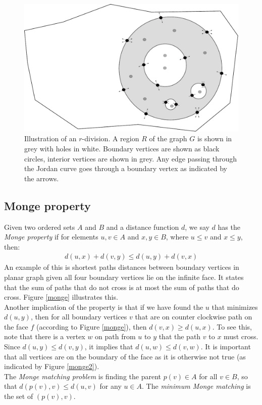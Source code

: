 \begin{figure}[h!]
  \includegraphics[width=1.0\textwidth]{figs/rdiv.pdf}
  \caption{Illustration of an $r$-division. A region $R$ of the graph $G$ is shown in
  grey with holes in white. Boundary vertices are shown as black circles, interior vertices are shown in
grey. Any edge passing through the Jordan curve goes through a boundary vertex as
indicated by the arrows.}
    \label{rdiv}
\end{figure}

\subsection{Monge property}
Given two ordered sets $A$ and $B$ and a distance function $d$, we say $d$ has the
\textit{Monge property} if for elements $u, v\in A$ and $x, y\in B$, where
$u\leq v$ and $x\leq y$, then:
\begin{align*}
  d(u,x)+d(v,y)\leq d(u, y)+d(v,x)
\end{align*}
An example of this is shortest paths distances between boundary vertices in planar graph
given all four boundary vertices lie on the infinite face. It states that the sum of
paths that do not cross is at most the sum of paths that do cross. Figure \ref{monge}
illustrates this. \\
Another implication of the property is that if we have found the $u$ that minimizes $d(u,y)$,
then for all boundary vertices $v$ that are on  counter clockwise path on the face $f$
(according to Figure \ref{monge}), then $d(v,x)\geq d(u,x)$. To see this, note that there
is a vertex $w$ on path from $u$ to $y$ that the path $v$ to $x$ must cross. Since
$d(u,y)\leq d(v,y)$, it implies that $d(u,w)\leq d(v,w)$. It is important that all
vertices are on the boundary of the face as it is otherwise not true (as indicated by
Figure \ref{monge2}). \\
The \textit{Monge matching problem} is finding the parent $p(v)\in A$ for all $v\in B$,
so that $d(p(v), v)\leq d(u,v)$ for any $u\in A$. The \textit{minimum Monge matching} is
the set of $(p(v), v)$.

